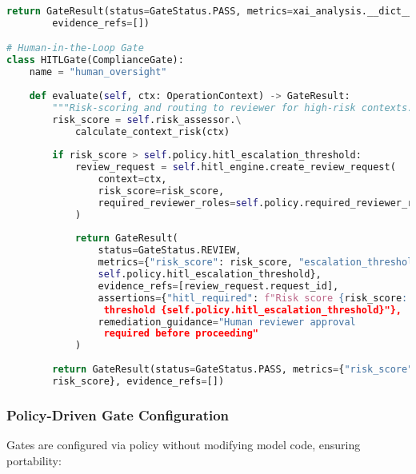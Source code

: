 \documentclass[12pt,a4paper]{article}
\begin{document}
\begin{lstlisting}[language=Python, caption=Specialized Compliance Gates]
        return GateResult(status=GateStatus.PASS, metrics=xai_analysis.__dict__, 
        evidence_refs=[])

# Human-in-the-Loop Gate
class HITLGate(ComplianceGate):
    name = "human_oversight"
    
    def evaluate(self, ctx: OperationContext) -> GateResult:
        """Risk-scoring and routing to reviewer for high-risk contexts."""
        risk_score = self.risk_assessor.\
            calculate_context_risk(ctx)
        
        if risk_score > self.policy.hitl_escalation_threshold:
            review_request = self.hitl_engine.create_review_request(
                context=ctx,
                risk_score=risk_score,
                required_reviewer_roles=self.policy.required_reviewer_roles
            )
            
            return GateResult(
                status=GateStatus.REVIEW,
                metrics={"risk_score": risk_score, "escalation_threshold": 
                self.policy.hitl_escalation_threshold},
                evidence_refs=[review_request.request_id],
                assertions={"hitl_required": f"Risk score {risk_score:.3f} >
                 threshold {self.policy.hitl_escalation_threshold}"},
                remediation_guidance="Human reviewer approval
                 required before proceeding"
            )
        
        return GateResult(status=GateStatus.PASS, metrics={"risk_score": 
        risk_score}, evidence_refs=[])
\end{lstlisting}

\subsubsection{Policy-Driven Gate Configuration}

Gates are configured via policy without modifying model code, ensuring portability:
\end{document}
